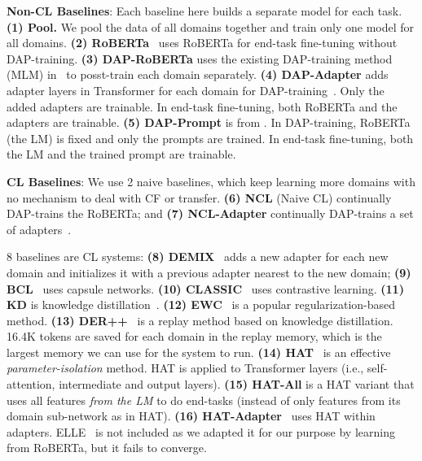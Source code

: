 \documentclass{article} \usepackage{iclr2023_conference,times}
\begin{document}
\textbf{Non-CL Baselines}: Each baseline here builds a separate model for each
task.  {\color{black}\textbf{(1) Pool. } We pool the data of all domains together and train only one model for all domains. }
\textbf{(2) RoBERTa}~\citep{DBLP:journals/corr/abs-1907-11692} uses RoBERTa for end-task fine-tuning without DAP-training. \textbf{(3) DAP-RoBERTa} uses the existing DAP-training method (MLM) in~\citep{DBLP:conf/acl/GururanganMSLBD20} to posst-train each domain separately. \textbf{(4) DAP-Adapter} adds adapter
layers in Transformer for each domain for DAP-training~\citep{jang2021continual,madotto2020continual,Houlsby2019Parameter}. Only the added adapters are trainable. In end-task fine-tuning, both RoBERTa and the adapters are trainable.  \textbf{(5) DAP-Prompt} is from \citep{DBLP:conf/emnlp/LesterAC21}. In DAP-training, RoBERTa (the LM) is fixed and only the prompts are trained. In end-task fine-tuning, both the LM and the trained prompt are trainable. 


\textbf{CL Baselines}: We use 2 naive baselines, which keep learning more domains with no mechanism to deal with CF or transfer. \textbf{(6) NCL} (Naive CL) continually DAP-trains the RoBERTa; and \textbf{(7) NCL-Adapter} continually DAP-trains a set of adapters~\citep{Houlsby2019Parameter}. 

8 baselines are CL systems: \textbf{(8) DEMIX}~\citep{gururangan2021demix} adds a new adapter for each new domain and initializes it with a previous adapter nearest to the new domain; 
\textbf{(9) BCL}~\citep{ke2021adapting} uses capsule networks. 
\textbf{(10) CLASSIC}~\citep{ke2021Classic} uses contrastive learning. \textbf{(11) KD} is knowledge distillation~\citep{hinton2015distilling}. \textbf{(12) EWC}~\citep{buzzega2020dark} is a popular
regularization-based method. \textbf{(13) DER++}~\citep{buzzega2020dark} is a replay method based on knowledge distillation. 16.4K tokens are saved for each domain in the replay memory, which is the largest memory we can use for the system to run. \textbf{(14) HAT}~\citep{Serra2018overcoming} is an effective \textit{parameter-isolation} method. HAT is applied to Transformer layers (i.e., self-attention, intermediate and output layers). {\color{black}\textbf{(15) HAT-All} is a HAT variant that uses all features \textit{from the LM} to do end-tasks (instead of only features from its domain sub-network as in HAT).} \textbf{(16) HAT-Adapter}~\citep{ke2021adapting} uses HAT within adapters.  ELLE~\citep{DBLP:conf/acl/QinZLL0SZ22} is not included as we adapted it for our purpose by learning from RoBERTa, {but it fails to converge.}  
\end{document}
